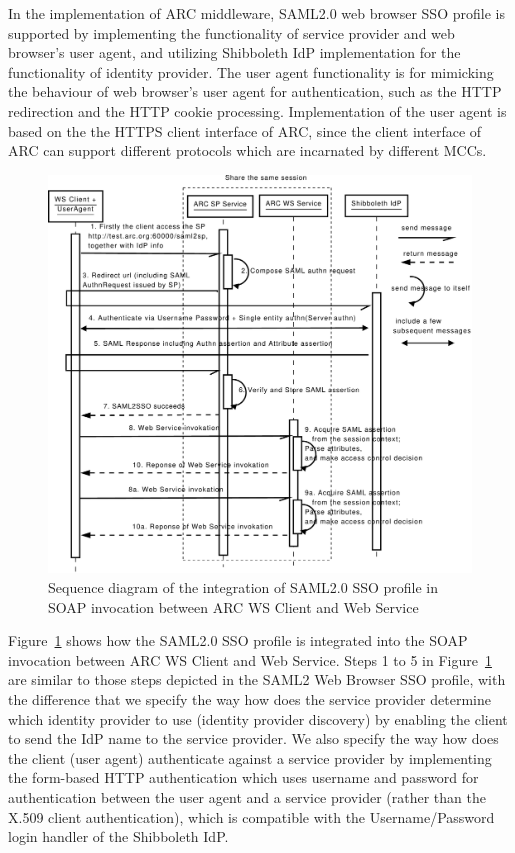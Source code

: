 \documentclass[conference]{IEEEtran}
\begin{document}
In the implementation of ARC middleware, SAML2.0 web browser SSO profile is
supported by implementing the functionality of service provider and web browser's user agent,
and utilizing Shibboleth IdP implementation for the functionality of identity provider. The
user agent functionality is for mimicking the behaviour of web browser's user agent for
authentication, such as the HTTP redirection and the HTTP cookie processing. Implementation
of the user agent is based on the the HTTPS client interface of ARC, since the client
interface of ARC can support different protocols which are incarnated by different MCCs.

\begin{figure}
\includegraphics[width=1.0\columnwidth]{SAML2SSO_UML.pdf}
\caption{Sequence diagram of the integration of SAML2.0 SSO profile in SOAP invocation 
between ARC WS Client and Web Service}
\label{fig:SAML2SSOUML}
\end{figure}

Figure~\ref{fig:SAML2SSOUML} shows how the SAML2.0 SSO profile is integrated
into the SOAP invocation between ARC WS Client and Web Service. Steps 1 to 5 in
Figure~\ref{fig:SAML2SSOUML} are similar to those steps depicted in the SAML2 Web Browser SSO profile, with
the difference that we specify the way how does the service provider determine which identity
provider to use (identity provider discovery) by enabling the client to send the IdP name to the service
provider. We also specify the way how does the client (user agent)
authenticate against a service provider by implementing the form-based HTTP authentication which uses username and
password for authentication between the user agent and a service provider (rather than the X.509 client authentication),
which is compatible with the Username/Password login handler of the Shibboleth IdP.
\end{document}
